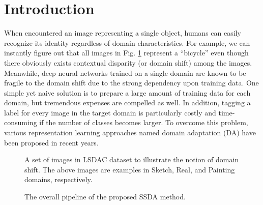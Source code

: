 \documentclass[a4paper,conference]{IEEEtran}
\begin{document}




%
\IEEEpeerreviewmaketitle



\section{Introduction}
\label{sec:intro}
When encountered an image representing a single object, humans can easily recognize its identity regardless of domain characteristics. For example, we can instantly figure out that all images in Fig. \ref{fig1} represent a ``bicycle'' even though there obviously exists contextual disparity (or domain shift\cite{pan2009survey}) among the images. Meanwhile, deep neural networks trained on a single domain are known to be fragile to the domain shift due to the strong dependency upon training data. One simple yet naive solution is to prepare a large amount of training data for each domain, but tremendous expenses are compelled as well. In addition, tagging a label for every image in the target domain is particularly costly and time-consuming if the number of classes becomes larger. To overcome this problem, various representation learning approaches named domain adaptation (DA) have been proposed in recent years\cite{wang2018deep}.




\begin{figure}[t!]
\begin{center}
\begin{minipage}{1.0\linewidth}
\end{minipage}
\end{center}
\caption{A set of images in LSDAC dataset\cite{peng2019moment}  to illustrate the notion of domain shift. The above images are examples in Sketch, Real, and Painting domains, respectively.}
\label{fig1}
\end{figure}



\begin{figure*}[t!]
\begin{center}
\begin{minipage}{1.0\linewidth}
\end{minipage}
\end{center}
\caption{The overall pipeline of the proposed SSDA method.}
\label{fig:proposed_pipeline}
\end{figure*}
\end{document}
